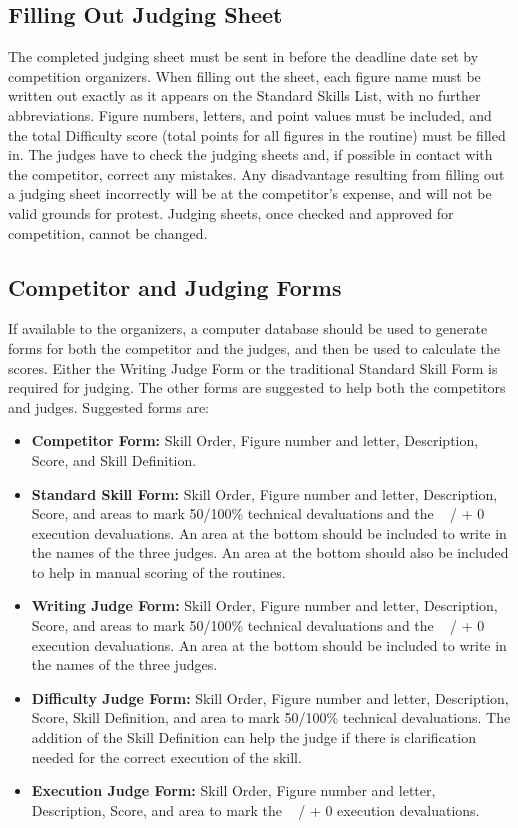\subsection{Filling Out Judging Sheet}
The completed judging sheet must be sent in before the deadline date set by competition organizers.
When filling out the sheet, each figure name must be written out exactly as it appears on the Standard Skills List, with no further abbreviations.
Figure numbers, letters, and point values must be included, and the total Difficulty score (total points for all figures in the routine) must be filled in.
The judges have to check the judging sheets and, if possible in contact with the competitor, correct any mistakes.
Any disadvantage resulting from filling out a judging sheet incorrectly will be at the competitor's expense, and will not be valid grounds for protest.
Judging sheets, once checked and approved for competition, cannot be changed.

\subsection{Competitor and Judging Forms}
If available to the organizers, a computer database should be used to generate forms for both the competitor and the judges, and then be used to calculate the scores.
Either the Writing Judge Form or the traditional Standard Skill Form is required for judging.
The other forms are suggested to help both the competitors and judges.
Suggested forms are: 
\begin{itemize}
\item \textbf{Competitor Form:} Skill Order, Figure number and letter, Description, Score, and Skill Definition.
\item \textbf{Standard Skill Form:} Skill Order, Figure number and letter, Description, Score, and areas to mark 50/100\% technical devaluations and the ~ / + 0 execution devaluations.
An area at the bottom should be included to write in the names of the three judges.
An area at the bottom should also be included to help in manual scoring of the routines.
\item \textbf{Writing Judge Form:} Skill Order, Figure number and letter, Description, Score, and areas to mark 50/100\% technical devaluations and the ~ / + 0 execution devaluations.
An area at the bottom should be included to write in the names of the three judges.
\item \textbf{Difficulty Judge Form:} Skill Order, Figure number and letter, Description, Score, Skill Definition, and area to mark 50/100\% technical devaluations.
The addition of the Skill Definition can help the judge if there is clarification needed for the correct execution of the skill.
\item \textbf{Execution Judge Form:} Skill Order, Figure number and letter, Description, Score, and area to mark the ~ / + 0 execution devaluations.
\end{itemize}

